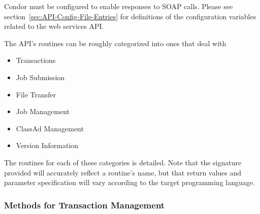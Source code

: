 Condor must be configured to enable responses to SOAP calls.
Please see 
section~\ref{sec:API-Config-File-Entries} for definitions of the
configuration variables related to the web services API.

The API's routines can be roughly categorized into ones that
deal with
\begin{itemize}
  \item Transactions
  \item Job Submission
  \item File Transfer
  \item Job Management
  \item ClassAd Management
  \item Version Information
\end{itemize}
The routines for each of these categories is detailed.
Note that the signature provided will accurately 
reflect a routine's name, 
but that return values and parameter specification
will vary according  to the target programming language.

\subsubsection{\label{WebService-Transactions} Methods for Transaction Management}

